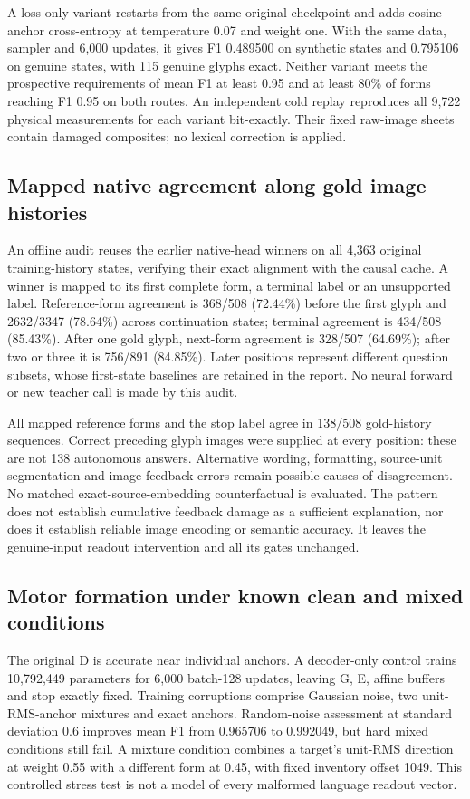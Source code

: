 \documentclass[10pt,a4paper]{article}
\providecommand{\DIFadd}[1]{{\protect\color{blue} \sf #1}} %
\begin{document}
\DIFadd{A loss-only variant restarts from the same original checkpoint and adds
cosine-anchor cross-entropy at temperature 0.07 and weight one. With the
same data, sampler and 6,000 updates, it gives F1 0.489500 on synthetic
states and 0.795106 on genuine states, with 115 genuine glyphs exact.
Neither variant meets the prospective requirements of mean F1 at least
0.95 and at least 80\% of forms reaching F1 0.95 on both routes.
An independent cold replay reproduces all 9,722 physical measurements for
each variant bit-exactly. Their fixed raw-image sheets contain damaged
composites; no lexical correction is applied.
}

\subsection*{\DIFadd{Mapped native agreement along gold image histories}}
\DIFadd{An offline audit reuses the earlier native-head winners on all 4,363 original
training-history states, verifying their exact alignment with the causal
cache. A winner is mapped to its first complete form, a terminal label or an
unsupported label. Reference-form agreement is 368/508 (72.44\%) before the
first glyph and 2632/3347 (78.64\%) across continuation states; terminal
agreement is 434/508 (85.43\%). After one gold glyph, next-form agreement is
328/507 (64.69\%); after two or three it is 756/891 (84.85\%). Later positions
represent different question subsets, whose first-state baselines are retained
in the report. No neural forward or new teacher call is made by this audit.
}

\DIFadd{All mapped reference forms and the stop label agree in 138/508 gold-history
sequences. Correct preceding glyph images were supplied at every position:
these are not 138 autonomous answers. Alternative wording, formatting,
source-unit segmentation and image-feedback errors remain possible causes of
disagreement. No matched exact-source-embedding counterfactual is evaluated.
The pattern does not establish cumulative feedback damage as a sufficient
explanation, nor does it establish reliable image encoding or semantic accuracy.
It leaves the genuine-input readout intervention and all its gates unchanged.
}

\subsection*{\DIFadd{Motor formation under known clean and mixed conditions}}
\DIFadd{The original D is accurate near individual anchors. A decoder-only control
trains 10,792,449 parameters for 6,000 batch-128 updates, leaving G, E, affine
buffers and stop exactly fixed. Training corruptions comprise Gaussian noise,
two unit-RMS-anchor mixtures and exact anchors. Random-noise assessment
at standard deviation 0.6 improves mean F1 from 0.965706 to 0.992049, but
hard mixed conditions still fail. A mixture condition combines a target's
unit-RMS direction at weight 0.55 with a different form at 0.45, with fixed
inventory offset 1049. This controlled stress test is not a model of every
malformed language readout vector.
}
\end{document}
